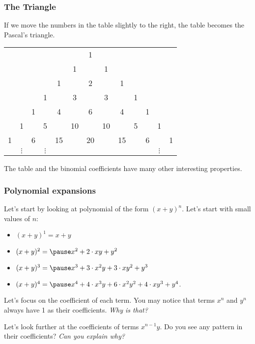 \begin{frame}\frametitle{The Triangle}
  If we move the numbers in the table slightly to the right, the table
  becomes the Pascal's triangle.
  \pause

  \vspace{0.1in}

  \begin{tcolorbox}
  \begin{tabular}{ccccccccccccc}
    & & & & & & 1 & & & & & & \\
    & & & & & 1 & & 1 & & & & & \\
    & & & & 1 & & 2 & & 1 & & & & \\
    & & & 1 & & 3 & & 3 & & 1 & & & \\
    & & 1 & & 4 & & 6 & & 4 & & 1 & & \\
    & 1 & & 5 & & 10 & & 10 & & 5 & & 1 & \\
    1 & & 6 & & 15 & & 20 & & 15 & & 6 & & 1 \\
    & $\vdots$ & & $\vdots$ & & & & & & & & $\vdots$ & \\
  \end{tabular}
  \end{tcolorbox}

  \vspace{0.1in}
  
  The table and the binomial coefficients have many other interesting
  properties.
\end{frame}

\begin{frame}\frametitle{Polynomial expansions}
  Let's start by looking at polynomial of the form $(x+y)^n$.  Let's
  start with small values of $n$:
  \begin{itemize}
  \item $(x+y)^1=x+y$
  \item $(x+y)^2 = \pause x^2 + 2\cdot xy + y^2$\\
  \item \pause $(x+y)^3 = \pause x^3 + 3\cdot x^2y + 3\cdot xy^2 + y^3$\\
  \item \pause $(x+y)^4 = \pause x^4 + 4\cdot x^3y + 6\cdot x^2y^2 + 4\cdot xy^3 + y^4$.
  \end{itemize}
  
  \vspace{0.1in}
  Let's focus on the coefficient of each term.  You may notice that
  terms $x^n$ and $y^n$ always have 1 as their coefficients.  {\em Why
    is that?} \pause

  Let's look further at the coefficients of terms $x^{n-1}y$.  Do you
  see any pattern in their coefficients?  {\em Can you explain why?}
\end{frame}
